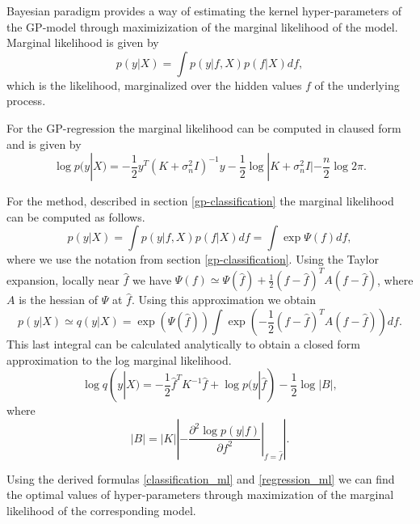 Bayesian paradigm provides a way of estimating the kernel hyper-parameters of the GP-model through maximizization of the marginal likelihood of the model. Marginal likelihood is given by
$$p(y | X) = \int p(y | f, X) p(f | X) df,$$
which is the likelihood, marginalized over the hidden values $f$ of the underlying process.

For the GP-regression the marginal likelihood can be computed in claused form and is given by
\begin{equation}
	\label{regression_ml}
	\log p(y | X) = -\frac 1 2 y^{T} (K + \sigma_n^2 I)^{-1} y - \frac 1 2 \log |K + \sigma_n^2 I| - \frac n 2 \log 2 \pi.
\end{equation}

For the method, described in section \ref{gp-classification} the marginal likelihood can be computed as follows.
$$p(y | X) = \int p(y | f, X) p(f | X) df = \int \exp{\Psi(f)} df,$$
where we use the notation from section \ref{gp-classification}. Using the Taylor expansion, locally near $\hat f$ we have $\Psi(f) \simeq \Psi(\hat f) + \frac 1 2(f - \hat f)^T A (f - \hat f)$, where $A$ is the hessian of $\Psi$ at $\hat f$. Using this approximation we obtain
$$p(y | X) \simeq q(y | X) = \exp(\Psi(\hat f)) \int \exp( - \frac 1 2 (f - \hat f)^T A (f - \hat f)) df.$$
This last integral can be calculated analytically to obtain a closed form approximation to the log marginal likelihood. 
\begin{equation}
	\label{classification_ml}
	\log q(y|X) = -\frac 1 2 \hat f^T K^{-1} \hat f + \log p(y|\hat f) - \frac 1 2 \log|B|,
\end{equation}
where 
$$|B| = |K| \left|- \left. \frac{\partial^2 \log p(y | f)}{\partial f^2} \right|_{f = \hat f} \right|.$$ 

Using the derived formulas \ref{classification_ml} and \ref{regression_ml} we can find the optimal values of hyper-parameters through maximization of the marginal likelihood of the corresponding model.